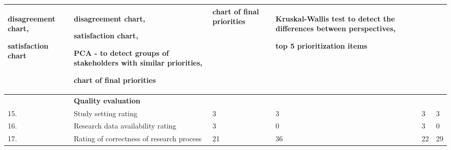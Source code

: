 \begin{table}
{\begin{tabular}{|>{\raggedright}p{}|>{\raggedright}p{}|>{\raggedright}p{}|>{\raggedright}p{}|>{\raggedright}p{}|>{\raggedright}p{}|}
disagreement chart,

satisfaction chart & 
disagreement chart,

satisfaction chart,

PCA - to detect groups of stakeholders with similar priorities,

chart of final priorities
&
chart of final priorities 
& 
Kruskal-Wallis test to detect the differences between perspectives,

top 5 prioritization items

\tabularnewline
\hline 
 & \textbf{Quality evaluation} &  &  &  & \tabularnewline
\hline 
15. & Study setting rating & 3 & 3 & 3 & 3\tabularnewline
\hline 
16. & Research data availability rating & 3 & 0 & 3 & 0\tabularnewline
\hline 
17. & Rating of correctness of research process & 21 & 36 & 22 & 29\tabularnewline
\hline
\end{tabular}%
}
\end{table}
